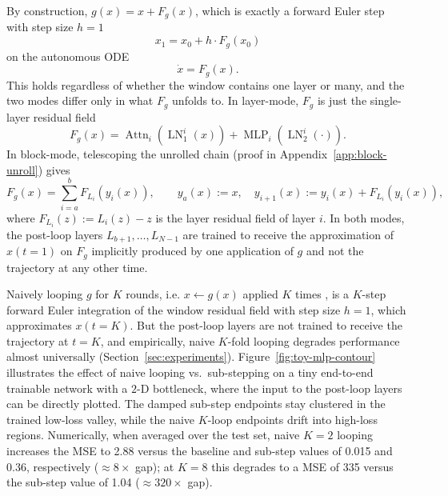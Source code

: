 By construction, $g(x) = x + F_g(x)$, which is exactly a forward Euler step with step size $h{=}1$
\begin{equation}
    x_1 = x_0 + h \cdot F_g(x_0)
\end{equation}
on the autonomous ODE \citep{bai2019deep,bai2020multiscale}
\begin{equation}
\dot{x}=F_g(x). 
\label{eq:ode}
\end{equation}
This holds regardless of whether the window contains one layer or many, and the two modes differ only in what $F_g$ unfolds to. In layer-mode, $F_g$ is just the single-layer residual field \[ F_g(x) = \operatorname{Attn}_i(\operatorname{LN}^i_1(x)) + \operatorname{MLP}_i(\operatorname{LN}^i_2(\cdot)). \]
In block-mode, telescoping the unrolled chain (proof in Appendix~\ref{app:block-unroll}) gives
\begin{equation}
F_g(x) = \sum_{i=a}^{b} F_{L_i}(y_i(x)),
\qquad y_a(x) := x,\quad y_{i+1}(x) := y_i(x) + F_{L_i}(y_i(x)),
\label{eq:block-effective-field}
\end{equation}
where $F_{L_i}(z) := L_i(z) - z$ is the layer residual field of layer $i$. In both modes, the post-loop layers $L_{b+1}, \ldots, L_{N-1}$ are trained to receive the approximation of $x(t{=}1)$ on $F_g$ implicitly produced by one application of $g$ and not the trajectory at any other time.



Naively looping $g$ for $K$ rounds, i.e. $x \leftarrow g(x)$ applied $K$ times \citep{dehghani2019universal,lan2020albert,liu2024looped,yang2025looped,saunshi2025reasoning,xu2025expressive,geiping2025scaling,zhu2025ouro,vonoswald2023transformers,ahn2024transformers,mahankali2024one,gatmiry2024looped,chen2024bypassing}, is a $K$-step forward Euler integration of the window residual field with step size $h{=}1$, which approximates $x(t{=}K)$. But the post-loop layers are not trained to receive the trajectory at $t{=}K$, and empirically, naive $K$-fold looping degrades performance almost universally (Section~\ref{sec:experiments}). Figure~\ref{fig:toy-mlp-contour} illustrates the effect of naive looping vs.\ sub-stepping on a tiny end-to-end trainable network with a $2$-D bottleneck, where the input to the post-loop layers can be directly plotted. The damped sub-step endpoints stay clustered in the trained low-loss valley, while the naive $K$-loop endpoints drift into high-loss regions. Numerically, when averaged over the test set, naive $K{=}2$ looping increases the MSE to 2.88 versus the baseline and sub-step values of 0.015 and 0.36, respectively ($\approx 8\times$ gap); at $K{=}8$ this degrades to a MSE of 335 versus the sub-step value of 1.04 ($\approx 320\times$ gap).

